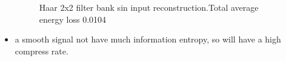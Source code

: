 \documentclass{beamer}
\begin{document}
\begin{frame}
\begin{itemize}
\begin{figure}[ht!]
\begin{minipage}{0.45\textwidth}
                      \caption{Haar 2x2 filter bank sin input reconstruction.Total average energy loss 0.0104}
                  \end{minipage}
              \end{figure}
        \item a smooth signal not have much information entropy, so will have a high compress rate.
    \end{itemize}
\end{frame}
\end{document}
